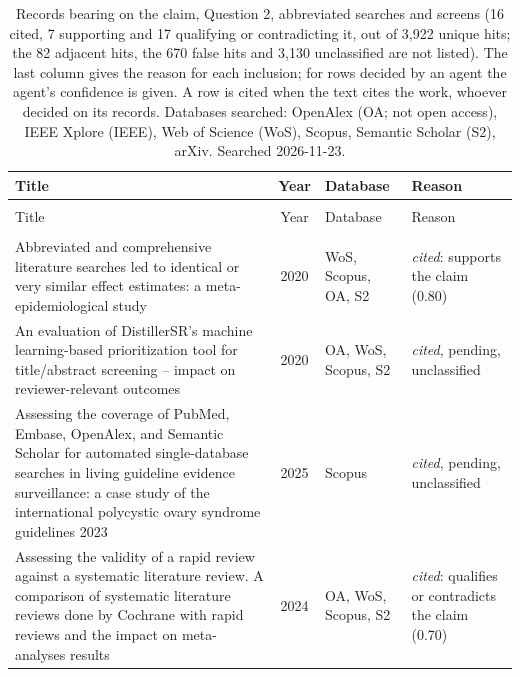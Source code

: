
\begingroup\footnotesize
\begin{longtable}{@{}%
  >{\raggedright\arraybackslash}p{}c%
  >{\raggedright\arraybackslash}p{}%
  >{\raggedright\arraybackslash}p{}@{}}
\caption{Records bearing on the claim, Question 2, abbreviated searches and screens (16 cited, 7 supporting and 17 qualifying or contradicting it, out of 3,922 unique hits; the 82 adjacent hits, the 670 false hits and 3,130 unclassified are not listed). The last column gives the reason for each inclusion; for rows decided by an agent the agent's confidence is given. A row is cited when the text cites the work, whoever decided on its records. Databases searched: OpenAlex (OA; not open access), IEEE Xplore (IEEE), Web of Science (WoS), Scopus, Semantic Scholar (S2), arXiv. Searched 2026-11-23.}\label{tab:screenlit-q2}\\
\toprule
Title & Year & Database & Reason \\
\midrule
\endfirsthead
\multicolumn{4}{@{}l}{\emph{\tablename~\thetable{} (cont.)}}\\
\toprule
Title & Year & Database & Reason \\
\midrule
\endhead
\midrule \multicolumn{4}{r@{}}{\emph{continued on next page}}\\
\endfoot
\bottomrule
\endlastfoot
Abbreviated and comprehensive literature searches led to identical or very similar effect estimates: a meta-epidemiological study & 2020 & WoS, Scopus, OA, S2 & \emph{cited}: supports the claim (0.80) \\
An evaluation of DistillerSR's machine learning-based prioritization tool for title/abstract screening -- impact on reviewer-relevant outcomes & 2020 & OA, WoS, Scopus, S2 & \emph{cited}, pending, unclassified \\
Assessing the coverage of PubMed, Embase, OpenAlex, and Semantic Scholar for automated single-database searches in living guideline evidence surveillance: a case study of the international polycystic ovary syndrome guidelines 2023 & 2025 & Scopus & \emph{cited}, pending, unclassified \\
Assessing the validity of a rapid review against a systematic literature review. A comparison of systematic literature reviews done by Cochrane with rapid reviews and the impact on meta-analyses results & 2024 & OA, WoS, Scopus, S2 & \emph{cited}: qualifies or contradicts the claim (0.70) \\

\end{longtable}
